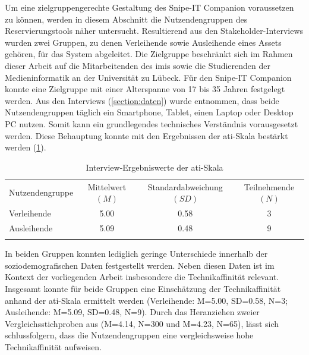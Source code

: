 \label{section:Nutzenden}
Um eine zielgruppengerechte Gestaltung des Snipe-IT Companion voraussetzen zu können, werden in
diesem Abschnitt die Nutzendengruppen des Reservierungstools näher untersucht. Resultierend aus den
Stakeholder-Interviews wurden zwei Gruppen, zu denen Verleihende sowie Ausleihende eines Assets
gehören, für das System abgeleitet. Die Zielgruppe beschränkt sich im Rahmen dieser Arbeit auf die
Mitarbeitenden des \ac{imis} sowie die Studierenden der Medieninformatik an der Universität zu
Lübeck. Für den Snipe-IT Companion konnte eine Zielgruppe mit einer Alterspanne von 17 bis 35 Jahren
festgelegt werden. Aus den Interviews (\ref{section:daten}) wurde entnommen, dass beide
Nutzendengruppen täglich ein Smartphone, Tablet, einen Laptop oder Desktop PC nutzen. Somit kann ein
grundlegendes technisches Verständnis vorausgesetzt werden. Diese Behauptung konnte mit den
Ergebnissen der \ac{ati}-Skala bestärkt werden (\ref{table:ati}).

\begin{table}[h]
        \centering
        \caption{Interview-Ergebniswerte der \ac{ati}-Skala}
        \begin{tabular}{lccc}
                \arrayrulecolor{maincolor}\hline
                \sffamily\color{maincolor}Nutzendengruppe &
                \sffamily\color{maincolor}Mittelwert $(M)$
                                                          & \sffamily\color{maincolor}Standardabweichung $(SD)$ &
                \sffamily\color{maincolor}Teilnehmende $(N)$
                \\
                \arrayrulecolor{maincolor}\hline
                Verleihende                               & 5.00
                                                          & 0.58                                                & 3
                \\
                Ausleihende                               & 5.09
                                                          & 0.48                                                & 9
                \\
                \arrayrulecolor{maincolor}\hline
        \end{tabular}
        \label{table:ati}
\end{table}

In beiden Gruppen konnten lediglich geringe Unterschiede innerhalb der
soziodemografischen Daten festgestellt werden. Neben diesen Daten ist im Kontext
der vorliegenden Arbeit insbesondere die Technikaffinität relevant. Insgesamt
konnte für beide Gruppen eine Einschätzung der Technikaffinität anhand der
\ac{ati}-Skala ermittelt werden (Verleihende: M=5.00, SD=0.58, N=3; Ausleihende:
M=5.09, SD=0.48, N=9). Durch das Heranziehen zweier Vergleichsstichproben aus
 (M=4.14, N=300 und M=4.23, N=65), lässt sich
schlussfolgern, dass die Nutzendengruppen eine vergleichsweise hohe
Technikaffinität aufweisen.


